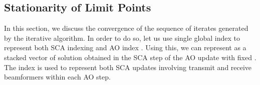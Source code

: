 \begin{comment}
\end{comment}

\subsection{Stationarity of Limit Points} \label{c-b}

In this section, we discuss the convergence of the sequence of iterates generated by the iterative algorithm. In order to do so, let us use single global index  to represent both \ac{SCA} indexing  and \ac{AO} index . Using this, we can represent  as a stacked vector of solution obtained in the  \ac{SCA} step of the  \ac{AO} update with fixed \eqn{\my}. The index  is used to represent both \ac{SCA} updates involving transmit and receive beamformers within each \ac{AO} step. 

